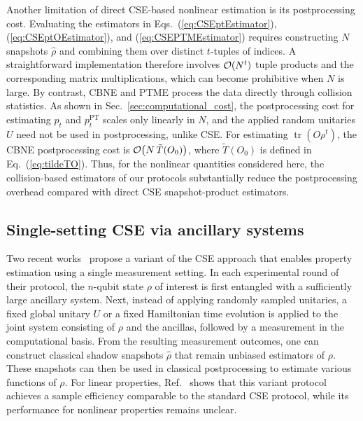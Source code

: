\documentclass[aps,prl,twocolumn,nofootinbib,superscriptaddress,10pt]{revtex4-2}
\let\originalleft\left
\let\originalright\right
\renewcommand{\left}{\mathopen{}\mathclose\bgroup\originalleft}
\renewcommand{\right}{\aftergroup\egroup\originalright}
\DeclareMathOperator{\Tr}{tr}
\newcommand{\bigo}[1]{\mathcal{O}\left(#1\right)}
\theoremstyle{plain}
\theoremstyle{definition}
\newcommand{\PT}{\mathrm{PT}}
\def\eqref#1{\textup{(\ref{#1})}}
\begin{document}
Another limitation of direct CSE-based nonlinear estimation is its postprocessing cost. 
Evaluating the estimators in Eqs.~\eqref{eq:CSEptEstimator}, \eqref{eq:CSEptOEstimator}, and \eqref{eq:CSEPTMEstimator} requires constructing \(N\) snapshots \(\hat\rho\) and combining them over distinct \(t\)-tuples of indices. 
A straightforward implementation therefore involves \(\bigo{N^t}\) tuple products and the corresponding matrix multiplications, which can become prohibitive when \(N\) is large.
By contrast, CBNE and PTME process the data directly through collision statistics. 
As shown in Sec.~\ref{sec:computational_cost}, the postprocessing cost for estimating \(p_t\) and \(p_t^{\PT}\) scales only linearly in \(N\), 
and the applied random unitaries \(U\) need not be used in postprocessing, unlike CSE. 
For estimating \(\Tr(O\rho^t)\), the CBNE postprocessing cost is \(\bigo{N\,\tilde T(O_0)}\), where \(\tilde T(O_0)\) is defined in Eq.~\eqref{eq:tildeTO}. 
Thus, for the nonlinear quantities considered here, the collision-based estimators of our protocols substantially reduce the postprocessing overhead compared with 
direct CSE snapshot-product estimators.


\subsection{Single-setting CSE via ancillary systems}

Two recent works~\cite{PhysRevX.13.011049,PhysRevLett.131.160601} propose a variant of the CSE approach that enables property estimation using a single measurement setting. 
In each experimental round of their protocol, the $n$-qubit state $\rho$ of interest is first entangled with a sufficiently large ancillary system. Next, instead of applying randomly sampled unitaries, a fixed global unitary $U$ or a fixed Hamiltonian time evolution is applied to the joint system consisting of $\rho$ and the ancillas, followed by a measurement in the computational basis. 
From the resulting measurement outcomes, one can construct classical shadow snapshots $\hat{\rho}$ that remain unbiased estimators of $\rho$. 
These snapshots can then be used in classical postprocessing to estimate various functions of $\rho$. %
For linear properties, Ref.~\cite{PhysRevLett.131.160601} shows that this variant protocol achieves a sample efficiency comparable to the standard CSE protocol, while its performance for nonlinear properties remains unclear.
\end{document}
